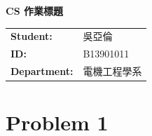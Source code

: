 \documentclass[12pt]{article}
\begin{document}
\thispagestyle{fancy}


\begin{center}
  {\Large \bfseries CS 作業標題}
\end{center}

\vspace{2em}

\begin{tabular}{@{}l l}
  \textbf{Student:} & 吳亞倫 \\
  \textbf{ID:} & B13901011  \\
  \textbf{Department:} & 電機工程學系
\end{tabular}
\bigskip

\section*{Problem 1}

\end{document}
